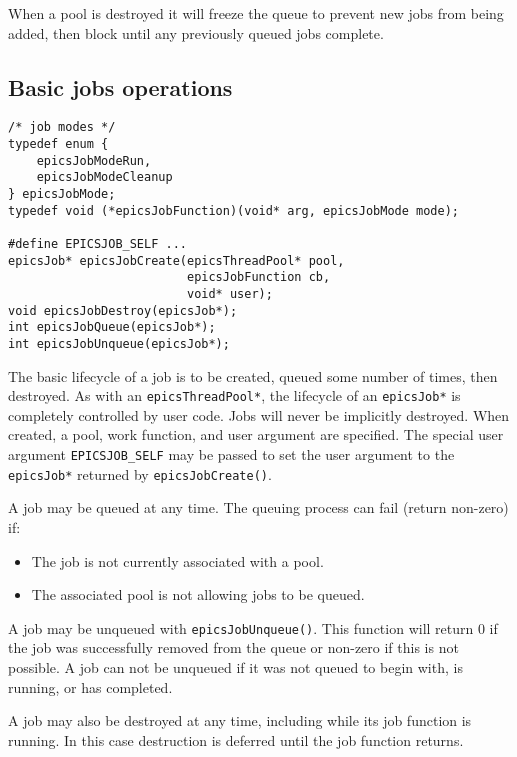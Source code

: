 When a pool is destroyed it will freeze the queue to prevent new jobs
from being added, then block until any previously queued jobs complete.

\subsection{Basic jobs operations}

\begin{verbatim}
/* job modes */
typedef enum {
    epicsJobModeRun,
    epicsJobModeCleanup
} epicsJobMode;
typedef void (*epicsJobFunction)(void* arg, epicsJobMode mode);

#define EPICSJOB_SELF ...
epicsJob* epicsJobCreate(epicsThreadPool* pool,
                         epicsJobFunction cb,
                         void* user);
void epicsJobDestroy(epicsJob*);
int epicsJobQueue(epicsJob*);
int epicsJobUnqueue(epicsJob*);
\end{verbatim}



The basic lifecycle of a job is to be created, queued some number of
times, then destroyed. As with an \verb|epicsThreadPool*|, the lifecycle of
an \verb|epicsJob*| is completely controlled by user code. Jobs will never
be implicitly destroyed. When created, a pool, work function, and
user argument are specified. The special user argument \verb|EPICSJOB_SELF|
may be passed to set the user argument to the \verb|epicsJob*| returned
by \verb|epicsJobCreate()|.

A job may be queued at any time. The queuing process can fail (return
non-zero) if:

\begin{itemize}
\item The job is not currently associated with a pool.
\item The associated pool is not allowing jobs to be queued.
\end{itemize}

A job may be unqueued with \verb|epicsJobUnqueue()|. This function will return
0 if the job was successfully removed from the queue or non-zero if this is
not possible. A job can not be unqueued if it was not queued to begin
with, is running, or has completed.

A job may also be destroyed at any time, including while its job function
is running. In this case destruction is deferred until the job function returns.

